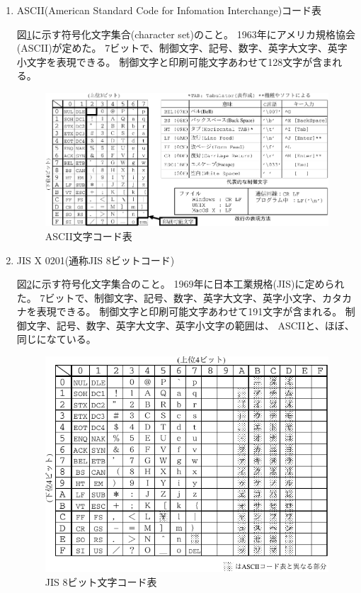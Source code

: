 \documentclass[uplatex]{jsarticle}
\begin{document}
\begin{enumerate}
\begin{enumerate}
\item ASCII(American Standard Code for Infomation Interchange)コード表

図\ref{fig2}に示す符号化文字集合(character set)のこと。
1963年にアメリカ規格協会(ASCII)が定めた。
7ビットで、制御文字、記号、数字、英字大文字、英字小文字を表現できる。
制御文字と印刷可能文字あわせて128文字が含まれる。

\begin{figure}[hbtp]
\begin{center}
\includegraphics[scale=0.9]{ascii.pdf}
\caption{ASCII文字コード表}
\label{fig2}
\end{center}
\end{figure}

\item JIS X 0201(通称JIS 8ビットコード)

図\ref{fig3}に示す符号化文字集合のこと。
1969年に日本工業規格(JIS)に定められた。
7ビットで、制御文字、記号、数字、英字大文字、英字小文字、カタカナを表現できる。
制御文字と印刷可能文字あわせて191文字が含まれる。
制御文字、記号、数字、英字大文字、英字小文字の範囲は、
ASCIIと、ほぼ、同じになている。

\begin{figure}[hbtp]
\begin{center}
\includegraphics[scale=0.9]{jisx0201.pdf}
\caption{JIS 8ビット文字コード表}
\label{fig3}
\end{center}
\end{figure}


\end{enumerate}
\end{enumerate}
\end{document}
